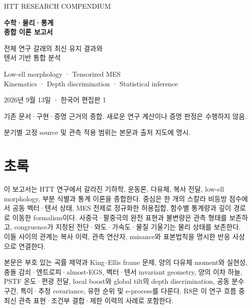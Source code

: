 \documentclass[11pt,a4paper]{article}
\begin{document}
\hypersetup{pageanchor=false}
\begin{titlepage}
\color{navy}\vspace*{25mm}
{\sffamily\large HTT RESEARCH COMPENDIUM}\par\vspace{10mm}
{\sffamily\Huge\bfseries 수학·물리·통계\\[4mm]종합 이론 보고서}\par\vspace{12mm}
{\Large 전체 연구 갈래의 최신 유지 결과와\\[3mm]텐서 기반 통합 분석}\par\vspace{18mm}
{\large Low-ell morphology · Tensorized MES\\[3mm]Kinematics · Depth discrimination · Statistical inference}\par
\vfill
\color{black}2026년 9월 13일 · 한국어 편집판 1\par
기존 문서·구현·증명 근거의 종합. 새로운 연구 계산이나 증명 판정은 수행하지 않음.\par
분기별 고정 source 및 관측 적용 범위는 본문과 출처 지도에 명시.\par
\end{titlepage}
\hypersetup{pageanchor=true}
\tableofcontents\clearpage{}
\section*{초록}


이 보고서는 HTT 연구에서 갈라진 기하학, 운동론, 다유체, 복사 전달, low-ell morphology, 부분 식별과 통계 이론을 종합한다. 중심은 한 개의 스칼라 비등방 점수에서 공동 벡터·텐서 상태, MES 전제로 정규화한 허용집합, 함수별 통계량과 깊이 경로로 이동한 formalism이다. 사중극·팔중극의 완전 표현과 불변량은 관측 형태를 보존하고, congruence가 지정된 전단·와도·가속도·물질 기울기는 물리 상태를 보존한다. 이들 사이의 관계는 복사 이력, 관측 연산자, nuisance와 표본법칙을 명시한 반응 사상으로 연결한다.


본문은 부호 있는 곡률 제약과 King–Ellis frame 문제, 양의 다유체 moment와 실현성, 충돌 감쇠·엔트로피·almost-EGS, 벡터·텐서 invariant geometry, 양의 이차 하늘, PSTF 온도·편광 전달, local boost와 global tilt의 depth discrimination, 공동 분수 구간, 특이·추정 covariance, 유한 순위 및 e-process를 다룬다. R8은 이 연구 흐름 중 최신 관측 표현·조건부 결합·제한 이력의 사례로 포함한다.
\end{document}
